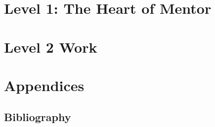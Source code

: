 \documentclass[oneside,twocolumn]{book}
\begin{document}



\frontmatter

\tableofcontents
 
%

\mainmatter
\part{Level 1: The Heart of Mentor}
\part{Level 2 Work}

\part{Appendices}
\appendix
\chapter{Bibliography}				%

\backmatter
\printindex										%
\end{document}
